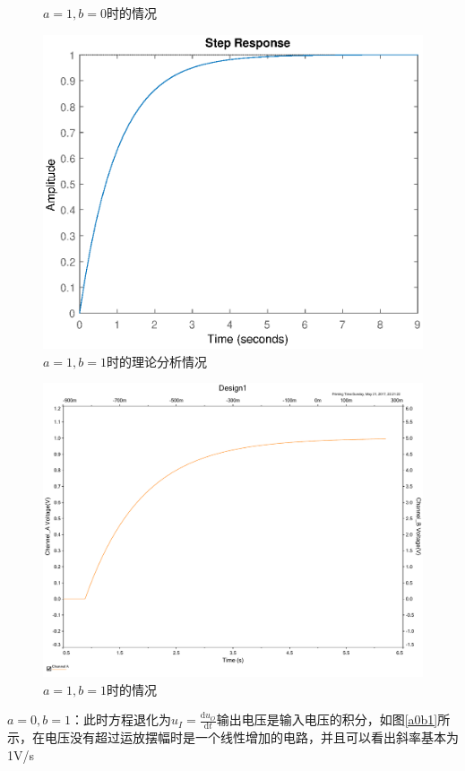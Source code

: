 \documentclass[UTF8,a4paper]{paper}
\begin{document}
\begin{multicols}{2}
\begin{figure}[H]
\caption{$a=1,b=0$时的情况}
\label{a1b0}
\end{figure}	
\begin{figure}[H]
\centering
\includegraphics[width=\columnwidth]{the.eps}
\caption{$a=1,b=1$时的理论分析情况}
\label{the}
\end{figure}
\begin{figure}[H]
\centering
\includegraphics[width=\columnwidth]{a1b1.pdf}
\caption{$a=1,b=1$时的情况}
\label{a1b1}
\end{figure}
\end{multicols}

$a=0,b=1$：此时方程退化为$u_I=\frac{\mathrm{d}u_O}{\mathrm{d}t}$输出电压是输入电压的积分，如图\ref{a0b1}所示，在电压没有超过运放摆幅时是一个线性增加的电路，并且可以看出斜率基本为1V/s
\end{document}
